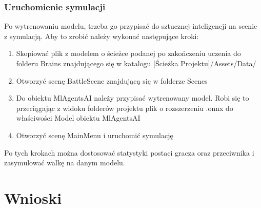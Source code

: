 \documentclass{SGGW-thesis}
\begin{document}
\subsection{Uruchomienie symulacji}
Po wytrenowaniu modelu, trzeba go przypisać do sztucznej inteligencji na scenie z symulacją. Aby to zrobić należy wykonać następujące kroki:
\begin{enumerate}
  \item{Skopiować plik z modelem o ścieżce podanej po zakończeniu uczenia do folderu Brains znajdującego się w katalogu [Ścieżka Projektu]/Assets/Data/}
  \item{Otworzyć scenę BattleScene znajdującą się w folderze Scenes}
  \item{Do obiektu MlAgentsAI należy przypisać wytrenowany model. Robi się to przeciągając z widoku folderów projektu plik o rozszerzeniu .onnx do właściwości Model obiektu MlAgentsAI}
  \item{Otworzyć scenę MainMenu i uruchomić symulację}
\end{enumerate}
Po tych krokach można dostosować statystyki postaci gracza oraz przeciwnika i zasymulować walkę na danym modelu.

\chapter{Wnioski}
\end{document}
